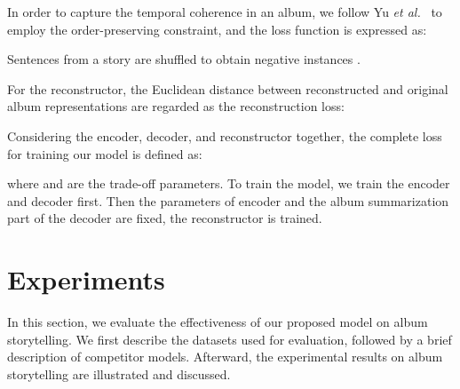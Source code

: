 \documentclass[letterpaper]{article} \usepackage{aaai19}  \usepackage{times}  \usepackage{helvet}  \usepackage{courier}  \usepackage{url}  \usepackage{graphicx}  \usepackage{color}
\begin{document}
In order to capture the temporal coherence in an album,
 we follow Yu \textit{et al.}~\cite{yu2017hierarchically} to employ the order-preserving constraint, and the loss function is expressed as:

Sentences from a story are shuffled to obtain negative instances .



For the reconstructor, the Euclidean distance between reconstructed and original album representations are regarded as the reconstruction loss:

Considering the encoder, decoder, and reconstructor together, the complete loss for training our model is defined as:

where  and  are the trade-off parameters. To train the model, we train the encoder and decoder first. Then the parameters of encoder and the album summarization part of the decoder are fixed, the reconstructor is trained.





\section{Experiments}

In this section, we evaluate the effectiveness of our proposed model on album storytelling. We first describe the datasets used for evaluation, followed by a brief description of competitor models. Afterward, the experimental results on album storytelling are illustrated and discussed.
\end{document}
